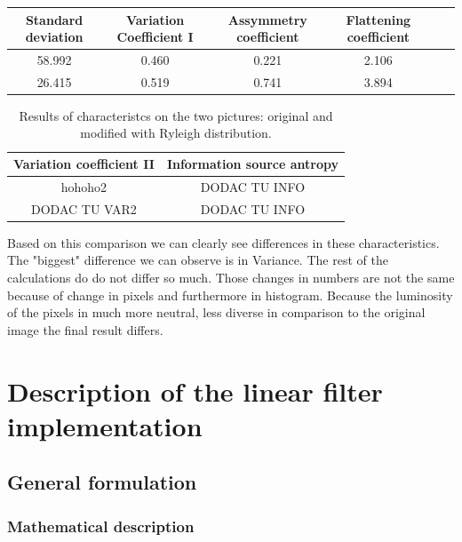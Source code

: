 \documentclass[12pt]{article}
\begin{document}
\begin{table}[H]\centering
    \begin{tabular}{cccccc}

        Standard deviation 	
        &  Variation Coefficient I
        & Assymmetry coefficient
        & Flattening coefficient
        \\\midrule
        58.992                        
        &    0.460  
        &      0.221 
        &		2.106
        \\
         26.415      
       &    0.519
       &    0.741 
       &	 3.894 

       \\

    \end{tabular}
\end{table}
\begin{table}[H]\centering
    \begin{tabular}{cc}


         Variation coefficient II
        & Information source antropy
        \\\midrule
        hohoho2                   
        &DODAC TU INFO
        \\
		DODAC TU VAR2
       	& DODAC TU INFO
       \\

    \end{tabular}
    \caption{Results of characteristcs on the two pictures: original and modified with Ryleigh distribution.}
\end{table}
Based on this  comparison we can clearly see differences in these characteristics. The "biggest" difference we can observe is in Variance. The rest of the calculations do do not differ so much. Those changes in numbers are not the same because of change in pixels and furthermore in histogram. Because the luminosity of the pixels in much more neutral, less diverse in comparison to the original image the final result differs.

\section{Description of the linear filter implementation}

\subsection{General formulation}

\subsubsection{Mathematical description}
\end{document}
